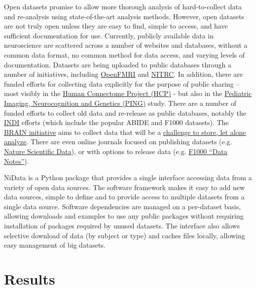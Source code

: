 \documentclass[twocolumn]{bmcart}%
\begin{document}
Open datasets promise to allow more thorough analysis of hard-to-collect
data and re-analysis using state-of-the-art analysis methods. However,
open datasets are not truly open unless they are easy to find, simple to
access, and have sufficient documentation for use. Currently, publicly
available data in neuroscience are scattered across a number of websites
and databases, without a common data format, no common method for data
access, and varying levels of documentation. Datasets are being uploaded
to public databases through a number of initiatives, including
\href{http://www.openfmri.org/}{OpenFMRI} and
\href{http://www.nitrc.org}{NITRC}. In addition, there are funded
efforts for collecting data explicitly for the purpose of public sharing
-- most visibly in the \href{http://www.humanconnectome.org/}{Human
Connectome Project (HCP)} - but also in the
\href{http://pingstudy.ucsd.edu/}{Pediatric Imaging, Neurocognition and
Genetics (PING)} study. There are a number of funded efforts to collect
old data and re-release as public databases, notably the
\href{http://fcon_1000.projects.nitrc.org/indi/IndiRetro.html}{INDI}\cite{Mennes2013}
efforts (which include the popular ABIDE and F1000 datasets). The
\href{http://braininitiative.nih.gov/}{BRAIN initiative} aims to collect
data that will be a
\href{http://www.brainupdate.nih.gov/calling-all-statisticians/}{challenge
to store, let alone analyze}. There are even online journals focused on
publishing datasets (e.g. \href{http://www.nature.com/sdata/}{Nature
Scientific Data}), or with options to release data (e.g.
\href{http://f1000research.com/articles?tab=ALL\&articleTypes=DATA_NOTE\&subjectArea=396}{F1000
``Data Notes''}).

NiData is a Python package that provides a single interface accessing
data from a variety of open data sources. The software framework makes
it easy to add new data sources, simple to define and to provide access
to multiple datasets from a single data source. Software dependencies
are managed on a per-dataset basis, allowing downloads and examples to
use any public packages without requiring installation of packages
required by unused datasets. The interface also allows selective
download of data (by subject or type) and caches files locally, allowing
easy management of big datasets.

\section{Results}\label{results}
\end{document}
